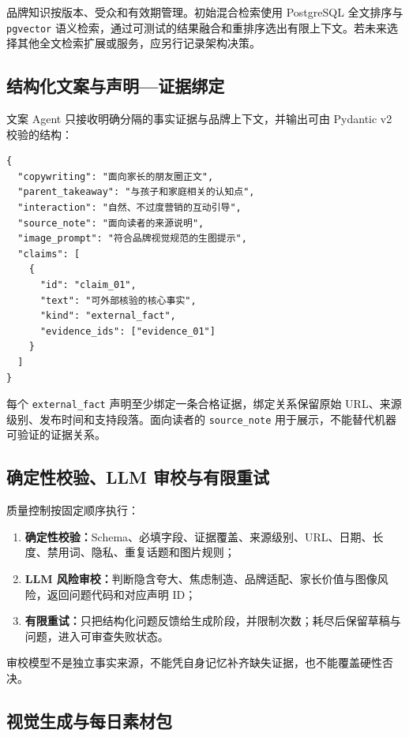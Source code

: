 \documentclass[UTF8,11pt,a4paper,fontset=none]{ctexart}
\begin{document}
品牌知识按版本、受众和有效期管理。初始混合检索使用 PostgreSQL 全文排序与 \texttt{pgvector} 语义检索，通过可测试的结果融合和重排序选出有限上下文。若未来选择其他全文检索扩展或服务，应另行记录架构决策。

\subsection{结构化文案与声明—证据绑定}

文案 Agent 只接收明确分隔的事实证据与品牌上下文，并输出可由 Pydantic v2 校验的结构：

\begin{lstlisting}
{
  "copywriting": "面向家长的朋友圈正文",
  "parent_takeaway": "与孩子和家庭相关的认知点",
  "interaction": "自然、不过度营销的互动引导",
  "source_note": "面向读者的来源说明",
  "image_prompt": "符合品牌视觉规范的生图提示",
  "claims": [
    {
      "id": "claim_01",
      "text": "可外部核验的核心事实",
      "kind": "external_fact",
      "evidence_ids": ["evidence_01"]
    }
  ]
}
\end{lstlisting}

每个 \texttt{external\_fact} 声明至少绑定一条合格证据，绑定关系保留原始 URL、来源级别、发布时间和支持段落。面向读者的 \texttt{source\_note} 用于展示，不能替代机器可验证的证据关系。

\subsection{确定性校验、LLM 审校与有限重试}

质量控制按固定顺序执行：
\begin{enumerate}[leftmargin=2em,itemsep=0.25em]
  \item \textbf{确定性校验：}Schema、必填字段、证据覆盖、来源级别、URL、日期、长度、禁用词、隐私、重复话题和图片规则；
  \item \textbf{LLM 风险审校：}判断隐含夸大、焦虑制造、品牌适配、家长价值与图像风险，返回问题代码和对应声明 ID；
  \item \textbf{有限重试：}只把结构化问题反馈给生成阶段，并限制次数；耗尽后保留草稿与问题，进入可审查失败状态。
\end{enumerate}

审校模型不是独立事实来源，不能凭自身记忆补齐缺失证据，也不能覆盖硬性否决。

\subsection{视觉生成与每日素材包}
\end{document}
